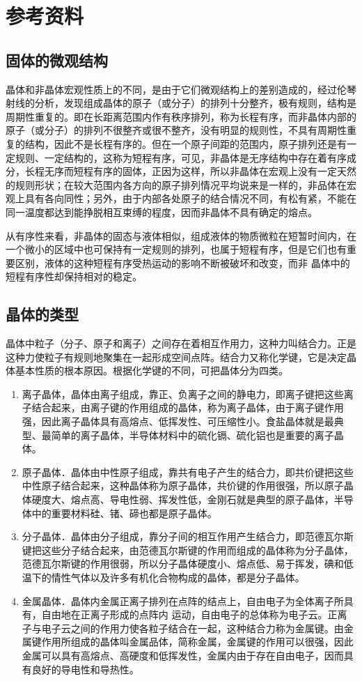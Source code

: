 \section{参考资料}
\subsection{固体的微观结构}

晶体和非晶体宏观性质上的不同，是由于它们微观结构上的差别造成的，经过伦琴射线的分析，发现组成晶体的原子（或分子）的排列十分整齐，极有规则，结构是周期性重复的。即在长距离范围内作有秩序排列，称为长程有序，而非晶体内部的原子（或分子）的排列不很整齐或很不整齐，没有明显的规则性，不具有周期性重复的结构，因此不是长程有序的。但在一个原子间距的范围内，原子排列还是有一定规则、一定结构的，这称为短程有序，可见，非晶体是无序结构中存在着有序成分，长程无序而短程有序的固体，正因为这样，所以非晶体在宏观上没有一定天然的规则形状；在较大范围内各方向的原子排列情况平均说来是一样的，非品体在宏观上具有各向同性；另外，由于内部各处原子的结合情况不同，有松有紧，不能在同一温度都达到能挣脱相互束缚的程度，因而非晶体不具有确定的熔点。

从有序性来看，非晶体的固态与液体相似，组成液体的物质微粒在短暂时间内，在一个微小的区域中也可保持有一定规则的排列，也属于短程有序，但是它们也有重要区别，液体的这种短程有序受热运动的影响不断被破坏和改变，而非
晶体中的短程有序性却保持相对的稳定。

\subsection{晶体的类型}

晶体中粒子（分子、原子和离子）之间存在着相互作用力，这种力叫结合力。正是这种力使粒子有规则地聚集在一起形成空间点阵。结合力又称化学键，它是决定晶体基本性质的根本原因。根据化学键的不同，可把晶体分为四类。
\begin{enumerate}
\item 离子晶体，晶体由离子组成，靠正、负离子之间的静电力，即离子键把这些离子结合起来，由离子键的作用组成的晶体，称为离子晶体，由于离子键作用强，因此离子晶体具有高熔点、低挥发性、可压缩性小。食盐晶体就是最典型、最简单的离子晶体，半导体材料中的硫化镉、硫化铝也是重要的离子晶体。
\item 原子晶体．晶体由中性原子组成，靠共有电子产生的结合力，即共价键把这些中性原子结合起来，这种晶体称为原子晶体，共价键的作用很强，所以原子晶体硬度大、熔点高、导电性弱、挥发性低，金刚石就是典型的原子晶体，半导体中的重要材料硅、锗、碲也都是原子晶体。
\item 分子晶体．晶体由分子组成，靠分子间的相互作用产生结合力，即范德瓦尔斯键把这些分子结合起来，由范德瓦尔斯键的作用而组成的晶体称为分子晶体，范德瓦尔斯键的作用很弱，所以分子晶体硬度小、熔点低、易于挥发，碘和低温下的情性气体以及许多有机化合物构成的晶体，都是分子晶体。
\item 金属晶体．晶体内金属正离子排列在点阵的结点上，自由电子为全体离子所具有，自由地在正离子形成的点阵内
运动，自由电子的总体称为电子云。正离子与电子云之间的作用力使各粒子结合在一起，这种结合力称为金属键。由金属键作用所组成的晶体叫金属品体，简称金属，金属键的作用可以很强，因此金属可以具有高熔点、高硬度和低挥发性，金属内由于存在自由电子，因而具有良好的导电性和导热性。
\end{enumerate}


